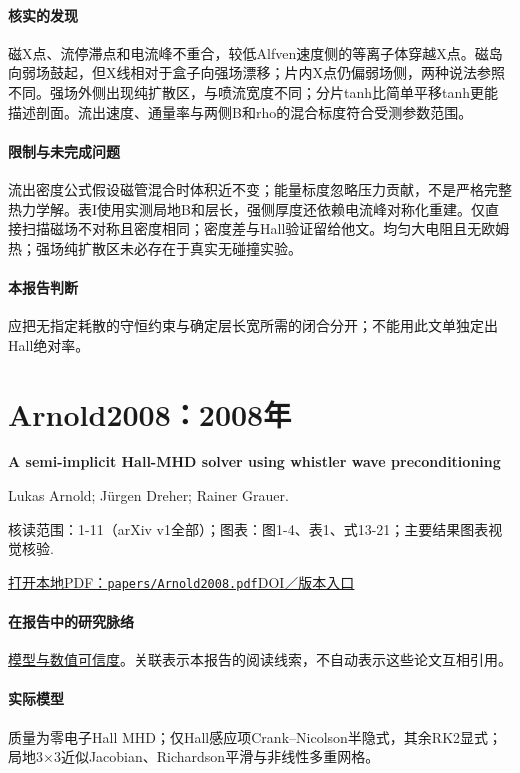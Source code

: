 \documentclass[UTF8,a4paper,11pt,openany,fontset=fandol]{ctexbook}
\begin{document}
\paragraph{核实的发现}磁X点、流停滞点和电流峰不重合，较低Alfven速度侧的等离子体穿越X点。磁岛向弱场鼓起，但X线相对于盒子向强场漂移；片内X点仍偏弱场侧，两种说法参照不同。强场外侧出现纯扩散区，与喷流宽度不同；分片tanh比简单平移tanh更能描述剖面。流出速度、通量率与两侧B和rho的混合标度符合受测参数范围。

\paragraph{限制与未完成问题}流出密度公式假设磁管混合时体积近不变；能量标度忽略压力贡献，不是严格完整热力学解。表I使用实测局地B和层长，强侧厚度还依赖电流峰对称化重建。仅直接扫描磁场不对称且密度相同；密度差与Hall验证留给他文。均匀大电阻且无欧姆热；强场纯扩散区未必存在于真实无碰撞实验。

\paragraph{本报告判断}应把无指定耗散的守恒约束与确定层长宽所需的闭合分开；不能用此文单独定出Hall绝对率。

\section{Arnold2008：2008年}\label{paper:Arnold2008}

\textbf{A semi-implicit Hall-MHD solver using whistler wave preconditioning}\citep{Arnold2008}\

Lukas Arnold;  Jürgen Dreher;  Rainer Grauer.

\textsf{核读范围：}1-11（arXiv v1全部）；\textsf{图表：}图1-4、表1、式13-21；主要结果图表视觉核验.

\href{run:../papers/Arnold2008.pdf}{打开本地PDF：\texttt{papers/Arnold2008.pdf}}\quad\href{https://doi.org/10.1016/j.cpc.2007.11.018}{DOI／版本入口}

\paragraph{在报告中的研究脉络}\hyperref[V1-ch:numerics]{模型与数值可信度}。关联表示本报告的阅读线索，不自动表示这些论文互相引用。

\paragraph{实际模型}质量为零电子Hall MHD；仅Hall感应项Crank–Nicolson半隐式，其余RK2显式；局地3×3近似Jacobian、Richardson平滑与非线性多重网格。
\end{document}
